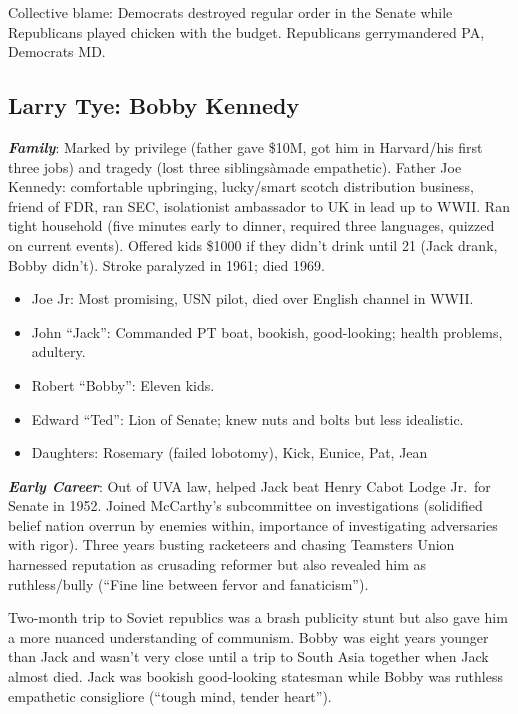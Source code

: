 \documentclass[
]{article}
\begin{document}
Collective blame: Democrats destroyed regular order in the Senate while
Republicans played chicken with the budget. Republicans gerrymandered
PA, Democrats MD.

\hypertarget{larry-tye-bobby-kennedy}{%
\subsection{Larry Tye: Bobby Kennedy}\label{larry-tye-bobby-kennedy}}

\textbf{\emph{Family}}: Marked by privilege (father gave \$10M, got him
in Harvard/his first three jobs) and tragedy (lost three siblingsàmade
empathetic). Father Joe Kennedy: comfortable upbringing, lucky/smart
scotch distribution business, friend of FDR, ran SEC, isolationist
ambassador to UK in lead up to WWII. Ran tight household (five minutes
early to dinner, required three languages, quizzed on current events).
Offered kids \$1000 if they didn't drink until 21 (Jack drank, Bobby
didn't). Stroke paralyzed in 1961; died 1969.

\begin{itemize}
\item
  Joe Jr: Most promising, USN pilot, died over English channel in WWII.
\item
  John ``Jack'': Commanded PT boat, bookish, good-looking; health
  problems, adultery.
\item
  Robert ``Bobby'': Eleven kids.
\item
  Edward ``Ted'': Lion of Senate; knew nuts and bolts but less
  idealistic.
\item
  Daughters: Rosemary (failed lobotomy), Kick, Eunice, Pat, Jean
\end{itemize}

\textbf{\emph{Early Career}}: Out of UVA law, helped Jack beat Henry
Cabot Lodge Jr.~for Senate in 1952. Joined McCarthy's subcommittee on
investigations (solidified belief nation overrun by enemies within,
importance of investigating adversaries with rigor). Three years busting
racketeers and chasing Teamsters Union harnessed reputation as crusading
reformer but also revealed him as ruthless/bully (``Fine line between
fervor and fanaticism'').

Two-month trip to Soviet republics was a brash publicity stunt but also
gave him a more nuanced understanding of communism. Bobby was eight
years younger than Jack and wasn't very close until a trip to South Asia
together when Jack almost died. Jack was bookish good-looking statesman
while Bobby was ruthless empathetic consigliore (``tough mind, tender
heart'').
\end{document}
